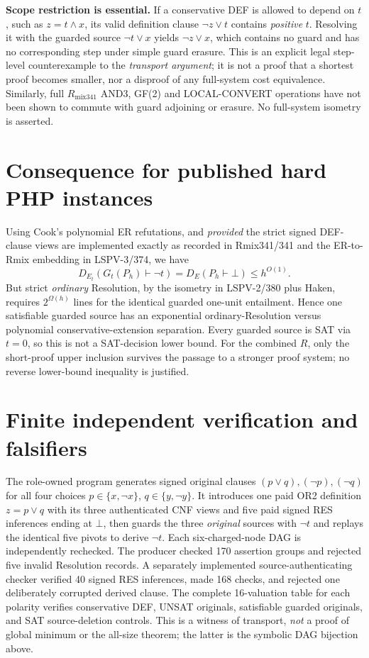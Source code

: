 \documentclass[11pt]{article}
\begin{document}
\noindent\textbf{Scope restriction is essential.}
If a conservative DEF is allowed to depend on $t$, such as
$z=t\wedge x$, its valid definition clause $\neg z\vee t$
contains \emph{positive} $t$. Resolving it with the guarded source
$\neg t\vee x$ yields $\neg z\vee x$, which contains no guard and
has no corresponding step under simple guard erasure.
This is an explicit legal step-level counterexample to the
\emph{transport argument}; it is not a proof that a shortest proof
becomes smaller, nor a disproof of any full-system cost equivalence.
Similarly, full $R_{\mathrm{mix341}}$ AND3, GF(2) and
LOCAL-CONVERT operations have not been shown to commute with guard
adjoining or erasure. No full-system isometry is asserted.

\section*{Consequence for published hard PHP instances}
Using Cook's polynomial ER refutations, and \emph{provided} the strict
signed DEF-clause views are implemented exactly as recorded in
Rmix341/341 and the ER-to-Rmix embedding in LSPV-3/374, we have
\[
 D_{E_t}(G_t(P_h)\vdash\neg t)
 =D_E(P_h\vdash\bot)\le h^{O(1)}.
\]
But strict \emph{ordinary} Resolution, by the isometry in LSPV-2/380
plus Haken, requires $2^{\Omega(h)}$ lines for the identical guarded
one-unit entailment. Hence one satisfiable guarded source has an
exponential ordinary-Resolution versus polynomial
conservative-extension separation. Every guarded source is
SAT via $t=0$, so this is not a SAT-decision lower bound.
For the combined $R$, only the short-proof upper inclusion survives
the passage to a stronger proof system; no reverse lower-bound
inequality is justified.

\section*{Finite independent verification and falsifiers}
The role-owned program generates signed original clauses
$(p\vee q),(\neg p),(\neg q)$ for all four choices
$p\in\{x,\neg x\}$, $q\in\{y,\neg y\}$.
It introduces one paid OR2 definition $z=p\vee q$ with its three
authenticated CNF views and five paid signed RES inferences ending
at $\bot$, then guards the three \emph{original} sources with
$\neg t$ and replays the identical five pivots to derive $\neg t$.
Each six-charged-node DAG is independently rechecked.
The producer checked 170 assertion groups and rejected five invalid
Resolution records. A separately implemented source-authenticating
checker verified 40 signed RES inferences, made 168 checks, and
rejected one deliberately corrupted derived clause. The complete
16-valuation table for each polarity verifies conservative DEF,
UNSAT originals, satisfiable guarded originals, and
SAT source-deletion controls. This is a witness of transport,
\emph{not} a proof of global minimum or the all-size theorem;
the latter is the symbolic DAG bijection above.
\end{document}
